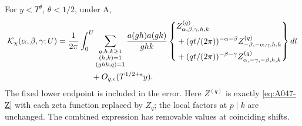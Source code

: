 \begin{lemma}
\label{lem:A048-three-shift}
For \(y<T^\theta\), \(\theta<1/2\), under A,
\begin{align}
 {\cal K}_\chi(\alpha,\beta,\gamma;U)
 ={}&\frac1{2\pi}\int_0^U
 \sum_{\substack{g,h,k\ge1\\(h,k)=1\\(ghk,q)=1}}
   \frac{a(gh)a(gk)}{ghk}
   \left\{\begin{aligned}
    &Z^{(q)}_{\alpha,\beta,\gamma,h,k}\\
    &+(qt/(2\pi))^{-\alpha-\beta}
              Z^{(q)}_{-\beta,-\alpha,\gamma,h,k}\\
    &+(qt/(2\pi))^{-\beta-\gamma}
              Z^{(q)}_{\alpha,-\gamma,-\beta,h,k}
   \end{aligned}\right\}dt\nonumber\\
 &\hspace{10mm}+O_{q,\epsilon}(T^{1/2+\epsilon}y).
 \label{eq:A048-three-shift}
\end{align}
The fixed lower endpoint is included in the error.
Here \(Z^{(q)}\) is exactly \eqref{eq:A047-Z} with
each zeta function replaced by \(Z_q\); the local
factors at \(p\mid k\) are unchanged.
The combined expression has removable values at
coinciding shifts.
\end{lemma}

